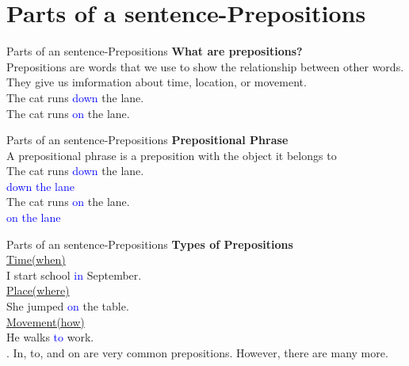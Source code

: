 \documentclass{beamer}
\begin{document}
\section{Parts of a sentence-Prepositions}

\begin{frame}{Parts of an sentence-Prepositions}
\centering
\textbf{What are prepositions?}\\
\vspace{0.2in}
Prepositions are words that we use to show the relationship between other words. They give us imformation about time, location, or movement.\\
\vspace{0.3in}
The cat runs \textcolor{blue}{down} the lane.\\
\vspace{0.2in}
The cat runs \textcolor{blue}{on} the lane.   
\end{frame}

\begin{frame}{Parts of an sentence-Prepositions}
\centering
\textbf{Prepositional Phrase}\\
\vspace{0.2in}
A prepositional phrase is a preposition with the object it belongs to\\
\vspace{0.2in}
The cat runs \textcolor{blue}{down} the lane.\\
\vspace{0.2in}
\textcolor{blue}{down the lane}\\
\vspace{0.2in}
The cat runs \textcolor{blue}{on} the lane.\\
\vspace{0.2in}
\textcolor{blue}{on the lane}\\   
\end{frame}


\begin{frame}{Parts of an sentence-Prepositions}
\centering
\textbf{Types of Prepositions}\\
\vspace{0.2in}
\underline{Time(when)}\\
I start school \textcolor{blue}{in} September.\\
\vspace{0.2in}
\underline{Place(where)}\\
She jumped \textcolor{blue}{on} the table.\\
\vspace{0.2in}
\underline{Movement(how)}\\
He walks \textcolor{blue}{to} work.\\
\vspace{0.2in}
. In, to, and on are very common prepositions. However, there are many more.     
\end{frame}
\end{document}
